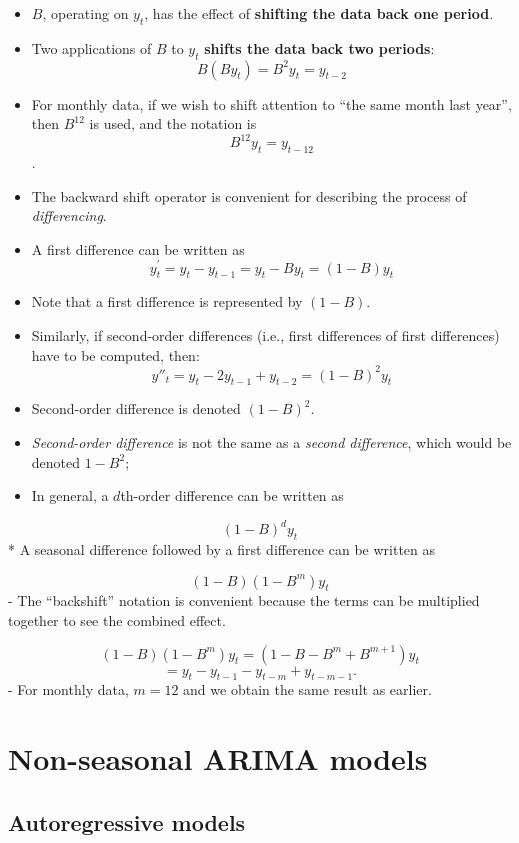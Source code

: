 \documentclass[]{book}
\begin{document}
\begin{itemize}
\item
  \(B\), operating on \(y_{t}\), has the effect of \textbf{shifting the data back one period}.
\item
  Two applications of \(B\) to \(y_{t}\) \textbf{shifts the data back two periods}:
  \[B(By_{t}) = B^{2}y_{t} = y_{t-2}\]
\item
  For monthly data, if we wish to shift attention to ``the same month last year'', then \(B^{12}\) is used, and the notation is \[B^{12}y_{t} = y_{t-12}\].
\item
  The backward shift operator is convenient for describing the process of \emph{differencing}.
\item
  A first difference can be written as
  \[y^{\prime}_{t}= y_{t} - y_{t-1}= y_t - By_{t} = (1 - B)y_{t}\]
\item
  Note that a first difference is represented by \((1 - B)\).
\item
  Similarly, if second-order differences (i.e., first differences of first differences) have to be computed, then:
  \[y''_{t} = y_{t} - 2y_{t - 1} + y_{t - 2} = (1 - B)^{2} y_{t}\]
\item
  Second-order difference is denoted \((1- B)^{2}\).
\item
  \emph{Second-order difference} is not the same as a \emph{second difference}, which would be denoted \(1- B^{2}\);
\item
  In general, a \(d\)th-order difference can be written as
\end{itemize}

\[(1 - B)^{d} y_{t}\]
* A seasonal difference followed by a first difference can be written as

\[(1-B)(1-B^m)y_t\]
- The ``backshift'' notation is convenient because the terms can be multiplied together to see the combined effect.

\[(1-B)(1-B^m)y_t = (1 - B - B^m + B^{m+1})y_t\]
\[= y_t-y_{t-1}-y_{t-m}+y_{t-m-1}.\]
- For monthly data, \(m=12\) and we obtain the same result as earlier.

\hypertarget{non-seasonal-arima-models}{%
\section{Non-seasonal ARIMA models}\label{non-seasonal-arima-models}}

\hypertarget{autoregressive-models}{%
\subsection{Autoregressive models}\label{autoregressive-models}}
\end{document}
